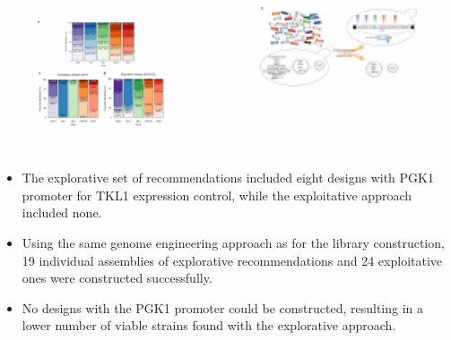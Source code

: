 \documentclass{beamer}
\begin{document}
\begin{frame}{}

 
		\begin{columns}
	    \begin{figure}
		\centering
		\includegraphics[width=3cm]{pic/图片21.pdf}\\
		\includegraphics[width=4cm]{pic/图片22.pdf}
  
 	    \end{figure}
	    \begin{figure}
		\centering
		\includegraphics[width=5cm]{pic/图片23.pdf}
 	    \end{figure}
        \end{columns}
    \begin{itemize} [<+-| alert@+>] %
        \item\scriptsize The explorative set of recommendations included eight designs with PGK1 promoter for TKL1 expression control, while the exploitative approach included none. 
        \item\scriptsize Using the same genome engineering approach as for the library construction, 19 individual assemblies of explorative recommendations and 24 exploitative ones were constructed successfully.  
        \item\scriptsize No designs with the PGK1 promoter could be constructed, resulting in a lower number of viable strains found with the explorative approach. 
        
    \end{itemize} 

\end{frame}
\end{document}
